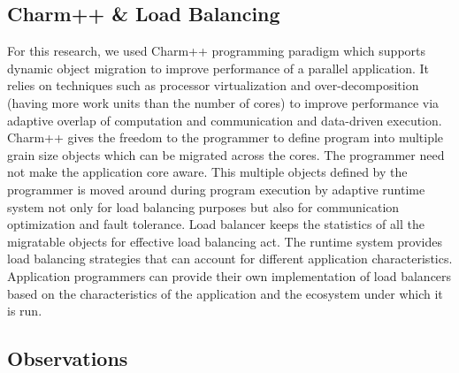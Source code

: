 \subsection{Charm++ \& Load Balancing}
For this research, we used Charm++ programming paradigm which supports dynamic
object migration to improve performance of a parallel
application\cite{KaleCharm}.  It relies on techniques such as processor
virtualization and over-decomposition (having more work units than the number
    of cores) to improve performance via adaptive overlap of computation and
communication and data-driven execution.  Charm++ gives the freedom to the
programmer to define program into multiple grain size objects which can be
migrated across the cores. The programmer need not make the application core
aware. This multiple objects defined by the programmer is moved around during
program execution by adaptive runtime system not only for load balancing
purposes but also for communication optimization and fault tolerance. Load
balancer keeps the statistics of all the migratable objects for effective load
balancing act\cite{appBalancer99}.  The runtime system provides load balancing
strategies that can account for different application characteristics.
Application programmers can provide their own implementation of load balancers
based on the characteristics of the application and the ecosystem under which
it is run.


\subsection{Observations}

